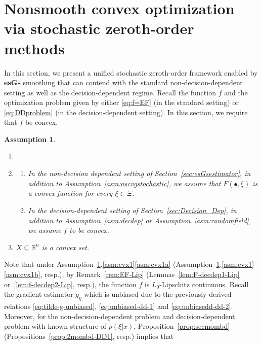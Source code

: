 \documentclass[11pt,reqno]{amsart}
\newcommand{\1}{{\bf 1}}
\newcommand{\2}{{\bf 2}}
\newcommand{\pc}[1]{{\color{cyan}#1}}
\numberwithin{equation}{section}
\newtheorem{assumption}{Assumption}[section]
\theoremstyle{remark}
\begin{document}
{			\section{{Nonsmooth convex optimization via stochastic zeroth-order methods} }\label{sec:conv_theorems} 
			In this section, we present a unified  stochastic zeroth-order framework enabled by {\bf esGs} smoothing that can contend with {the standard non-decision-dependent setting as well as the decision-dependent regime}. Recall the function $f$ and the optimization problem given by either \eqref{eq:f=EF} (in the standard setting) or \eqref{eq:DDproblem} (in the decision-dependent setting). In this section, we require that $f$ be convex.
			\begin{assumption}\label{asm:covstoc2}
				\begin{enumerate}[label=\arabic*., leftmargin=*]
					\item[]
					\item\label{asm:cvx1}
					\begin{enumerate}[label=(\alph*), leftmargin=*, nosep]
						\item\label{asm:cvx1a} In the non-decision dependent setting of Section~\ref{sec:esGsestimator}, in addition to Assumption~\ref{asm:ascvgstochastic}, we assume that $F(\bullet,\xi)$ is a convex function for every $\xi \in \Xi$.
						\item\label{asm:cvx1b} In the decision-dependent setting of Section~\ref{sec:Decision_Dep}, in addition to Assumption~\ref{asm:decdep} or Assumption~\ref{asm:randomfield}, we assume $f$ to be convex.
					\end{enumerate}
					\item\label{asm:covstoc3}  $X \subseteq \mathbb{R}^n$ is a convex set. %
				\end{enumerate}
			\end{assumption}
			Note that under Assumption~\ref{asm:covstoc2}.\ref{asm:cvx1}\ref{asm:cvx1a} (Assumption~\ref{asm:covstoc2}.\ref{asm:cvx1}\ref{asm:cvx1b}, resp.), by Remark~\ref{rem:EF-Lip} (Lemmas~\ref{lem:F-decdep1-Lip} or~\ref{lem:f-decdep2-Lip}, resp.), the function $f$ is $L_0$-Lipschitz continuous. 
			Recall the gradient estimator $\tilde{g}_{\eta}$ which is unbiased due to the previously derived relations \eqref{eq:tilde-g-unbiased}, \eqref{eq:unbiased-dd-1} and \eqref{eq:unbiasedd-dd-2}.
			Moreover, for the non-decision-dependent problem and decision-dependent problem with known structure of $p(\xi | x)$, Proposition~\ref{prop:secmombd} (Propositions~\ref{prop:2mombd-DD1}, resp.) implies that
}
\end{document}
